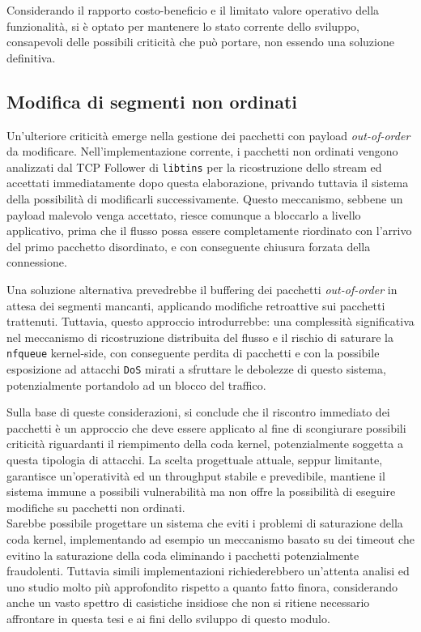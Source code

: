 Considerando il rapporto costo-beneficio e il limitato valore operativo della funzionalità, si è optato per mantenere lo stato corrente dello sviluppo, consapevoli delle possibili criticità che può portare, non essendo una soluzione definitiva.

\subsection{Modifica di segmenti non ordinati}

Un'ulteriore criticità emerge nella gestione dei pacchetti con payload \emph{out-of-order} da modificare. Nell'implementazione corrente, i pacchetti non ordinati vengono analizzati dal TCP Follower di \texttt{libtins} per la ricostruzione dello stream ed accettati immediatamente dopo questa elaborazione, privando tuttavia il sistema della possibilità di modificarli successivamente. Questo meccanismo, sebbene un payload malevolo venga accettato, riesce comunque a bloccarlo a livello applicativo, prima che il flusso possa essere completamente riordinato con l'arrivo del primo pacchetto disordinato, e con conseguente chiusura forzata della connessione.

Una soluzione alternativa prevedrebbe il buffering dei pacchetti \emph{out-of-order} in attesa dei segmenti mancanti, applicando modifiche retroattive sui pacchetti trattenuti. Tuttavia, questo approccio introdurrebbe: una complessità significativa nel meccanismo di ricostruzione distribuita del flusso e il rischio di saturare la \texttt{nfqueue} kernel-side, con conseguente perdita di pacchetti e con la possibile esposizione ad attacchi \texttt{DoS} mirati a sfruttare le debolezze di questo sistema, potenzialmente portandolo ad un blocco del traffico.

Sulla base di queste considerazioni, si conclude che il riscontro immediato dei pacchetti è un approccio che deve essere applicato al fine di scongiurare possibili criticità riguardanti il riempimento della coda kernel, potenzialmente soggetta a questa tipologia di attacchi. La scelta progettuale attuale, seppur limitante, garantisce un'operatività ed un throughput stabile e prevedibile, mantiene il sistema immune a possibili vulnerabilità ma non offre la possibilità di eseguire modifiche su pacchetti non ordinati.\\

Sarebbe possibile progettare un sistema che eviti i problemi di saturazione della coda kernel, implementando ad esempio un meccanismo basato su dei timeout che evitino la saturazione della coda eliminando i pacchetti potenzialmente fraudolenti. Tuttavia simili implementazioni richiederebbero un'attenta analisi ed uno studio molto più approfondito rispetto a quanto fatto finora, considerando anche un vasto spettro di casistiche insidiose che non si ritiene necessario affrontare in questa tesi e ai fini dello sviluppo di questo modulo.\\

